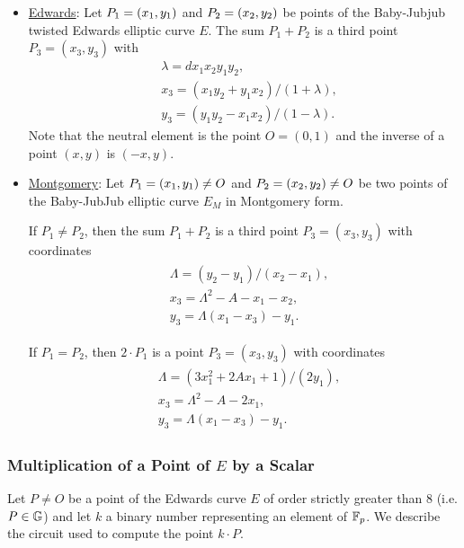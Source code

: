\documentclass{article}
\begin{document}
\begin{spacing}{1.2}
		\begin{itemize}
			
			\item \underline{Edwards}: 	
			Let $P_{1} = (x_{1}, y_{1})$ and $P_{2} = (x_{2}, y_{2})$ be points of the Baby-Jubjub twisted Edwards elliptic curve $E$. The sum $P_1 + P_2$ is a third point $P_3 = (x_3, y_3)$ with 
				\begin{align*}
				&\lambda = d x_1x_2y_1y_2,\\
				&x_3 = (x_1y_2 + y_1x_2) / (1 + \lambda),\\
				&y_3 = (y_1y_2 - x_1x_2) / (1 - \lambda).
				\end{align*}
			Note that the neutral element is the point $O = (0,1)$ and the inverse of a point $(x,y)$ is $(-x,y)$.
			
			\item \underline{Montgomery}: 
			Let $P_{1} = (x_{1}, y_{1})\not=O$ and $P_{2} = (x_{2}, y_{2})\not=O$ be two points of the Baby-JubJub elliptic curve $E_M$ in Montgomery form. 
			
			If $P_1\not=P_2$, then the sum $P_1 + P_2$ is a third point $P_3 = (x_3, y_3)$ with coordinates
			\begin{align}
			\label{eq-ted}
				\begin{split}
				&\Lambda = (y_2-y_1)/ (x_2-x_1),\\
				&x_3 = \Lambda^2 - A - x_1 - x_2,\\
				&y_3 = \Lambda(x_1- x_3) - y_1.
				\end{split}
			\end{align}
			
			If $P_1 = P_2$, then $2\cdot P_1$ is a point $P_3 = (x_3, y_3)$ with coordinates
			\begin{align}
			\label{eq-mont}
				\begin{split}
				&\Lambda = (3x_1^2 + 2Ax_1 + 1)/ (2y_1),\\
				&x_3 = \Lambda^2 - A - 2x_1,\\
				&y_3 = \Lambda(x_1- x_3) - y_1.
				\end{split}	
			\end{align}
			
		\end{itemize}
	
	
		\subsubsection{Multiplication of a Point of $E$ by a Scalar}
		
		Let $P\not= O$ be a point of the Edwards curve $E$ of order strictly greater than 8 (i.e. $P\in\mathbb{G}$) and let $k$ a binary number representing an element of $\mathbb{F}_p$. We describe the circuit used to compute the point $k\cdot P$.
		

\end{spacing}
\end{document}
